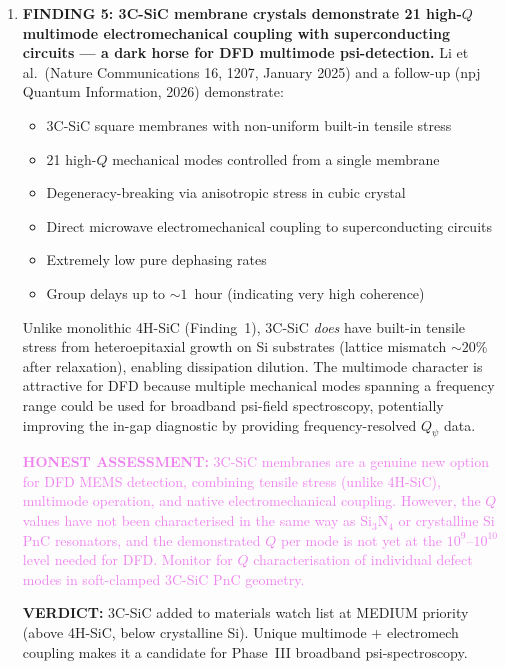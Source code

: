 \documentclass[11pt]{article}
\theoremstyle{definition}
\theoremstyle{remark}
\newcommand{\Qpsi}{Q_\psi}
\newcommand{\honest}[1]{\textcolor{violet}{\textbf{HONEST ASSESSMENT:} #1}}
\newcommand{\verdict}[1]{\textcolor{green!50!black}{\textbf{VERDICT:} #1}}
\begin{document}
\begin{tcolorbox}[colback=blue!5!white, colframe=blue!50!black,
  title=\textbf{W4i14 TOP 5 FINDINGS --- Ranked by Programme Impact}]
\begin{enumerate}
\item \textbf{FINDING 5: 3C-SiC membrane crystals demonstrate 21
high-$Q$ multimode electromechanical coupling with superconducting
circuits --- a dark horse for DFD multimode psi-detection.}
Li et al.\ (Nature Communications 16, 1207, January 2025) and a
follow-up (npj Quantum Information, 2026) demonstrate:
\begin{itemize}[nosep]
\item 3C-SiC square membranes with non-uniform built-in tensile stress
\item 21 high-$Q$ mechanical modes controlled from a single membrane
\item Degeneracy-breaking via anisotropic stress in cubic crystal
\item Direct microwave electromechanical coupling to superconducting
  circuits
\item Extremely low pure dephasing rates
\item Group delays up to $\sim 1$~hour (indicating very high
  coherence)
\end{itemize}

Unlike monolithic 4H-SiC (Finding~1), 3C-SiC \textit{does} have
built-in tensile stress from heteroepitaxial growth on Si substrates
(lattice mismatch $\sim 20\%$ after relaxation), enabling dissipation
dilution. The multimode character is attractive for DFD because
multiple mechanical modes spanning a frequency range could be used
for broadband psi-field spectroscopy, potentially improving the
in-gap diagnostic by providing frequency-resolved $\Qpsi$ data.

\honest{3C-SiC membranes are a genuine new option for DFD MEMS
detection, combining tensile stress (unlike 4H-SiC), multimode
operation, and native electromechanical coupling. However, the
$Q$ values have not been characterised in the same way as Si$_3$N$_4$
or crystalline Si PnC resonators, and the demonstrated $Q$ per mode
is not yet at the $10^9$--$10^{10}$ level needed for DFD. Monitor
for $Q$ characterisation of individual defect modes in soft-clamped
3C-SiC PnC geometry.}

\verdict{3C-SiC added to materials watch list at MEDIUM priority
(above 4H-SiC, below crystalline Si). Unique multimode + electromech
coupling makes it a candidate for Phase~III broadband psi-spectroscopy.}

\end{enumerate}
\end{tcolorbox}


\end{document}
